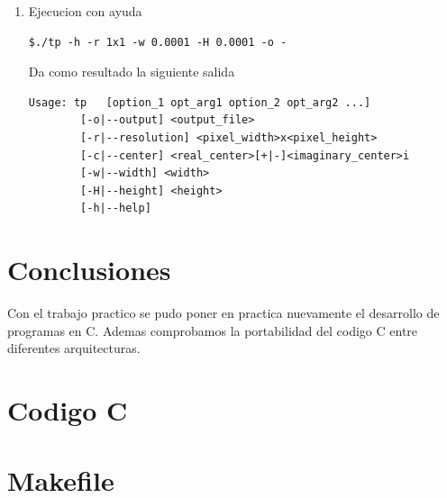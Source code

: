 \documentclass[10pt,spanish,a4paper,openany,notitlepage]{article}
\newcommand{\captionlisting}[2][]{%
}
\begin{document}
\begin{enumerate}
\item Ejecucion con ayuda
\begin{framed}
\begin{verbatim}$./tp -h -r 1x1 -w 0.0001 -H 0.0001 -o -\end{verbatim}
\end{framed}
Da como resultado la siguiente salida
\begin{framed}
\begin{verbatim}Usage: tp 	[option_1 opt_arg1 option_2 opt_arg2 ...]
		[-o|--output] <output_file>
		[-r|--resolution] <pixel_width>x<pixel_height>
		[-c|--center] <real_center>[+|-]<imaginary_center>i
		[-w|--width] <width>
		[-H|--height] <height>
		[-h|--help]\end{verbatim}
\end{framed}

\end{enumerate}

\section{Conclusiones}

Con el trabajo practico se pudo poner en practica nuevamente el desarrollo de programas en C. Ademas comprobamos la portabilidad del codigo C entre diferentes arquitecturas.



\newpage
\appendix
\section{Codigo C}

\captionlisting{tp.c}

\newpage
\section{Makefile}



\newpage


\end{document}
